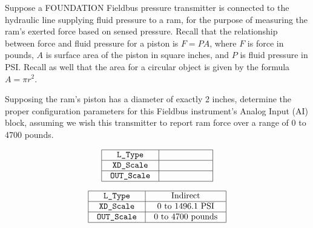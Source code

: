 

Suppose a FOUNDATION Fieldbus pressure transmitter is connected to the hydraulic line supplying fluid pressure to a ram, for the purpose of measuring the ram's exerted force based on sensed pressure.  Recall that the relationship between force and fluid pressure for a piston is $F = PA$, where $F$ is force in pounds, $A$ is surface area of the piston in square inches, and $P$ is fluid pressure in PSI.  Recall as well that the area for a circular object is given by the formula $A = \pi r^2$.

\vskip 10pt

Supposing the ram's piston has a diameter of exactly 2 inches, determine the proper configuration parameters for this Fieldbus instrument's Analog Input (AI) block, assuming we wish this transmitter to report ram force over a range of 0 to 4700 pounds.


$$\vbox{\offinterlineskip
\halign{\strut
\vrule \quad\hfil # \ \hfil & 
\vrule \quad\hfil # \ \hfil \vrule \cr
\noalign{\hrule}
%
{\tt L\_Type} & \hskip 50pt \cr
%
\noalign{\hrule}
%
{\tt XD\_Scale} & \hskip 50pt \cr
%
\noalign{\hrule}
%
{\tt OUT\_Scale} & \hskip 50pt \cr
%
\noalign{\hrule}
} %
}$$ %








$$\vbox{\offinterlineskip
\halign{\strut
\vrule \quad\hfil # \ \hfil & 
\vrule \quad\hfil # \ \hfil \vrule \cr
\noalign{\hrule}
%
{\tt L\_Type} & Indirect \cr
%
\noalign{\hrule}
%
{\tt XD\_Scale} & 0 to 1496.1 PSI \cr
%
\noalign{\hrule}
%
{\tt OUT\_Scale} & 0 to 4700 pounds \cr
%
\noalign{\hrule}
} %
}$$ %












